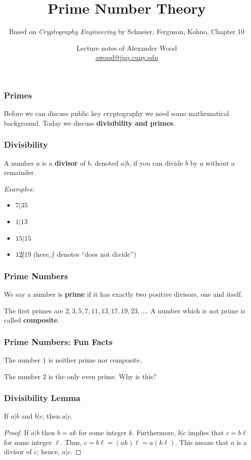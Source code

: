 \documentclass{beamer}
\title[Primes]{Prime Number Theory}
\subtitle{Based on  \emph{Cryptography Engineering} by Schneier, Ferguson, Kohno, Chapter 10}
\author
{Lecture notes of Alexander Wood \\ \scriptsize \href{mailto:awood@jjay.cuny.edu}{awood@jjay.cuny.edu}}
\institute[JJay]{John Jay College of Criminal Justice}
\date{}
\newcommand{\<}{\langle}
\renewcommand{\>}{\rangle}
\begin{document}

\begin{frame}
  \titlepage
\end{frame}

\begin{frame}
\frametitle{Primes}

Before we can discuss public key cryptography we need some mathematical background. Today we discuss \textbf{divisibility and primes}.
\end{frame}


\begin{frame}
\frametitle{Divisibility}

A number $a$ is a \textbf{divisor} of $b$, denoted $a|b$, if you can divide $b$ by $a$ without a remainder. \newline
\pause

\emph{Examples:}
\begin{itemize}
\item $7|35$
\item $1|13$
\item $15|15$
\item $12 \not| 19$ (here, $\not |$ denotes ``does not divide'')
\end{itemize}
\end{frame}


\begin{frame}
\frametitle{Prime Numbers}

We say a number is \textbf{prime} if it has exactly two positive divisors, one and itself.\newline

The first primes are $2, 3, 5, 7, 11, 13, 17, 19, 23, \dots$. A number which is not prime is called \textbf{composite}. 
\end{frame}

\begin{frame}
\frametitle{Prime Numbers: Fun Facts}

The number $1$ is neither prime nor composite.\newline

The number $2$ is the only even prime. Why is this?
\end{frame}

\begin{frame}
\frametitle{Divisibility Lemma}

\begin{lemma}
If $a|b$ and $b|c$, then $a|c$.
\end{lemma}
\begin{proof}
If $a|b$ then $b=ak$ for some integer $k$. Furthermore, $b|c$ implies that $c=b\ell$ for some integer $\ell$. Thus, $c=b\ell = (ak)\ell = a(k\ell)$. This means that $a$ is a divisor of $c$; hence, $a|c$.
\end{proof}
\end{frame}
\end{document}
